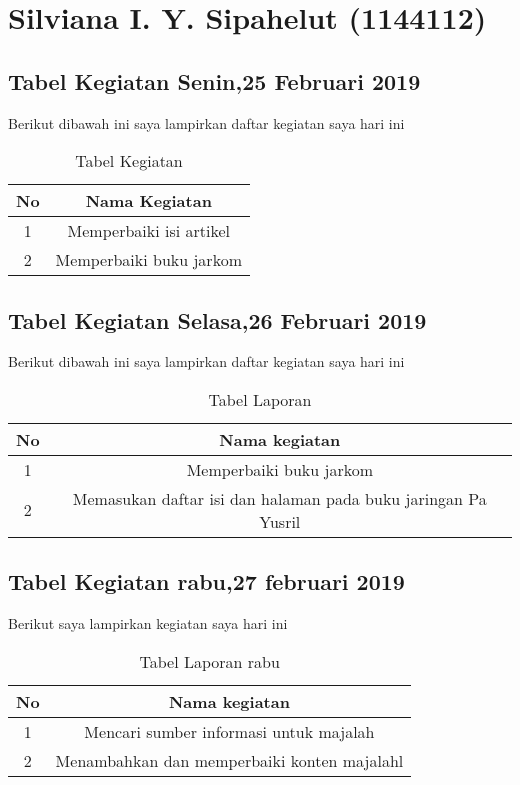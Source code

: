 \chapter{Silviana I. Y. Sipahelut (1144112)}
\section{Tabel Kegiatan Senin,25 Februari 2019}
Berikut dibawah ini saya lampirkan daftar kegiatan saya hari ini
\begin{table}[h]
\caption{Tabel Kegiatan}
\centering
\begin{tabular}{|c|c|}
\hline
No&Nama Kegiatan\\
\hline
1&Memperbaiki isi artikel\\
\hline
2&Memperbaiki buku jarkom\\
\hline
\end{tabular}
\label{table:Laporan kegiatan}
\end{table}

\section{Tabel Kegiatan Selasa,26 Februari 2019}
Berikut dibawah ini saya lampirkan daftar kegiatan saya hari ini
\begin{table}[h]
\caption{Tabel Laporan}
\centering
\begin{tabular}{|c|c|}
\hline
No&Nama kegiatan\\
\hline
1&Memperbaiki buku jarkom\\
\hline
2&Memasukan daftar isi dan halaman pada buku jaringan Pa Yusril\\
\hline
\end{tabular}
\label{table:Laporan kegiatan}
\end{table}

\section{Tabel Kegiatan rabu,27 februari 2019}
Berikut saya lampirkan kegiatan saya hari ini 
\begin{table}[h]
\caption{Tabel Laporan rabu}
\centering
\begin{tabular}{|c|c|}
\hline
No&Nama kegiatan\\
\hline
1&Mencari sumber informasi untuk majalah\\
\hline
2&Menambahkan dan memperbaiki konten majalahl\\
\hline
\end{tabular}
\label{table:Laporan kegiatan hari ini}
\end{table}